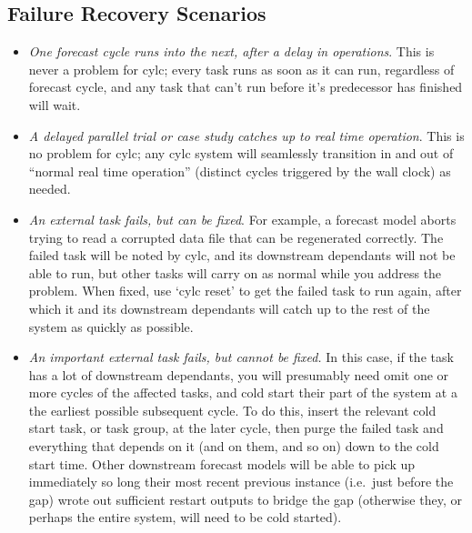 \documentclass[11pt,a4paper]{article}
\begin{document}
\subsection{Failure Recovery Scenarios}
\label{FailureRecoveryScenarios}

\begin{itemize}
    \item {\em One forecast cycle runs into the next, after a delay in
        operations}. This is never a problem for cylc; every task runs
        as soon as it can run, regardless of forecast cycle, and any
        task that can't run before it's predecessor has finished will
        wait.

    \item {\em A delayed parallel trial or case study catches up to real
        time operation}. This is no problem for cylc; any cylc system
        will seamlessly transition in and out of ``normal real time
        operation'' (distinct cycles triggered by the wall clock) as needed.

    \item {\em An external task fails, but can be fixed}. For example, a
        forecast model aborts trying to read a corrupted data file that
        can be regenerated correctly. The failed task will be noted by
        cylc, and its downstream dependants will not be able to run,
        but other tasks will carry on as normal while you address the
        problem. When fixed, use `cylc reset' to get the failed task to
        run again, after which it and its downstream dependants will
        catch up to the rest of the system as quickly as possible.

    \item {\em An important external task fails, but cannot be fixed.}
        In this case, if the task has a lot of downstream dependants,
        you will presumably need omit one or more cycles of the affected
        tasks, and cold start their part of the system at a the earliest
        possible subsequent cycle.  To do this, insert the relevant cold
        start task, or task group, at the later cycle, then purge the
        failed task and everything that depends on it (and on them, and
        so on) down to the cold start time.  Other downstream forecast
        models will be able to pick up immediately so long their most
        recent previous instance (i.e.\ just before the gap) wrote out
        sufficient restart outputs to bridge the gap (otherwise they,
        or perhaps the entire system, will need to be cold started). 


\end{itemize}
\end{document}
